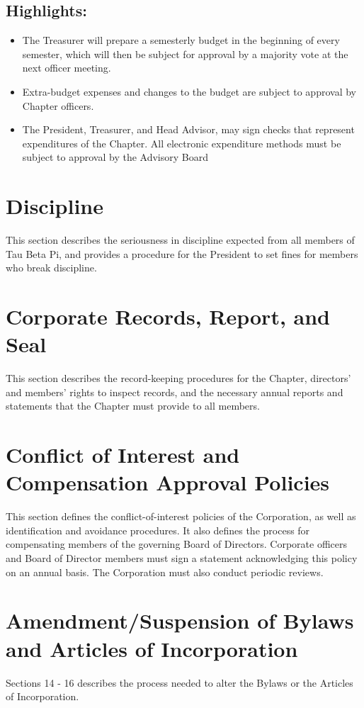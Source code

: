 \documentclass{article}
\begin{document}
	\subsection*{Highlights:}
	\begin{itemize}
		\item The Treasurer will prepare a semesterly budget in the beginning of every semester, which will then be subject for approval by a majority vote at the next officer meeting.
		\item Extra-budget expenses and changes to the budget are subject to approval by Chapter officers.
		\item The President, Treasurer, and Head Advisor, may sign checks that represent expenditures of the Chapter. All electronic expenditure methods must be subject to approval by the Advisory Board
	\end{itemize}
	
	\section{Discipline}
	This section describes the seriousness in discipline expected from all members of Tau Beta Pi, and provides a procedure for the President to set fines for members who break discipline.
	
	\section{Corporate Records, Report, and Seal}
	This section describes the record-keeping procedures for the Chapter, directors' and members' rights to inspect records, and the necessary annual reports and statements that the Chapter must provide to all members.
	
	\section{Conflict of Interest and Compensation Approval Policies}
	This section defines the conflict-of-interest policies of the Corporation, as well as identification and avoidance procedures. It also defines the process for compensating members of the governing Board of Directors. Corporate officers and Board of Director members must sign a statement acknowledging this policy on an annual basis. The Corporation must also conduct periodic reviews.	
	
	\section {Amendment/Suspension of Bylaws and Articles of Incorporation}
	Sections 14 - 16 describes the process needed to alter the Bylaws or the Articles of Incorporation.
	
\end{document}
